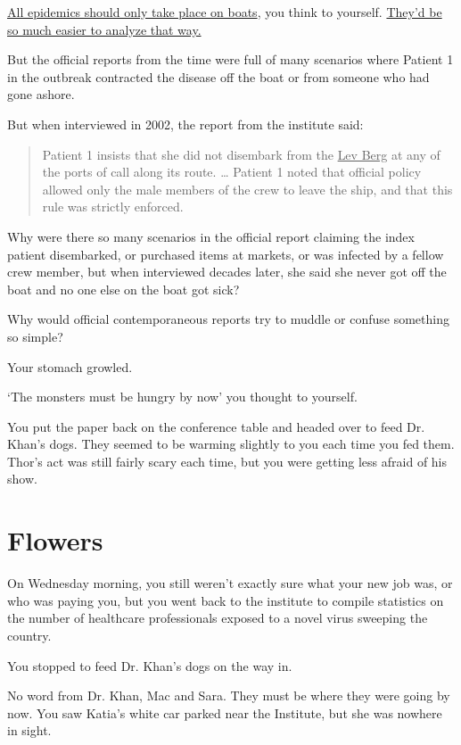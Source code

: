 \documentclass[17pt, twoside, a5paper, openright, extrafontsizes]{memoir}
\renewcommand{\emph}[1]{\ul{#1}}
\begin{document}
\emph{All epidemics should only take place on boats}, you think to yourself.
\emph{They'd be so much easier to analyze that way.}

But the official reports from the time were full of many scenarios where
Patient 1 in the outbreak contracted the disease off the boat or from
someone who had gone ashore.

But when interviewed in 2002, the report from the institute said:

\begin{quote}
Patient 1 insists that she did not disembark from the \emph{Lev Berg} at
any of the ports of call along its route. \ldots{} Patient 1 noted that
official policy allowed only the male members of the crew to leave the
ship, and that this rule was strictly enforced.
\end{quote}

Why were there so many scenarios in the official report claiming the
index patient disembarked, or purchased items at markets, or was
infected by a fellow crew member, but when interviewed decades later,
she said she never got off the boat and no one else on the boat got
sick?

Why would official contemporaneous reports try to muddle or confuse
something so simple?

Your stomach growled.

`The monsters must be hungry by now' you thought to yourself.

You put the paper back on the conference table and headed over to feed
Dr. Khan's dogs. They seemed to be warming slightly to you each time you
fed them. Thor's act was still fairly scary each time, but you were
getting less afraid of his show.


\chapter{Flowers}

On Wednesday morning, you still weren't exactly sure what your new job
was, or who was paying you, but you went back to the institute to
compile statistics on the number of healthcare professionals exposed to
a novel virus sweeping the country.

You stopped to feed Dr. Khan's dogs on the way in.

No word from Dr. Khan, Mac and Sara. They must be where they were going
by now. You saw Katia's white car parked near the Institute, but she was
nowhere in sight.
\end{document}
